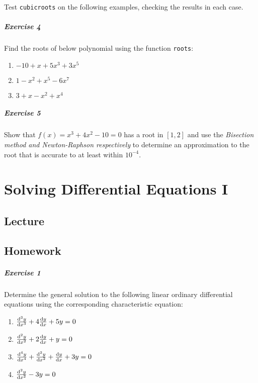 \documentclass[a4paper]{book}
\begin{document}
Test {\tt cubicroots} on the following examples, checking the results in each case.



\paragraph{Exercise 4}
Find the roots of below polynomial using the function {\tt roots}:
\begin{enumerate}
\item $-10+x+5x^3+3x^5$
\item $1-x^2+x^5-6x^7$
\item $3+x-x^2+x^4$
\end{enumerate}



\paragraph{Exercise 5}
Show that $f (x ) = x^3 + 4x^2 - 10 = 0$ has a root in $[1, 2]$ and 
use the \emph{Bisection method and Newton-Raphson respectively} to 
determine an approximation to the root that is accurate to at 
least within $10^{-4}$.



\setcounter{chapter}{9}

\chapter{Solving Differential Equations I}
\section{Lecture}

\section{Homework}
\paragraph{Exercise 1}
Determine the general solution to the following linear ordinary differential equations using
the corresponding characteristic equation:
\begin{enumerate}
\item $\dv[3]{y}{x} + 4\dv{y}{x} + 5 y = 0$
\item $\dv[2]{y}{x} + 2\dv{y}{x} + y = 0$
\item $\dv[4]{y}{x} + \dv[2]{y}{x} + \dv{y}{x} + 3y = 0$
\item $\dv[2]{y}{x} - 3y = 0$
\end{enumerate}


\end{document}
